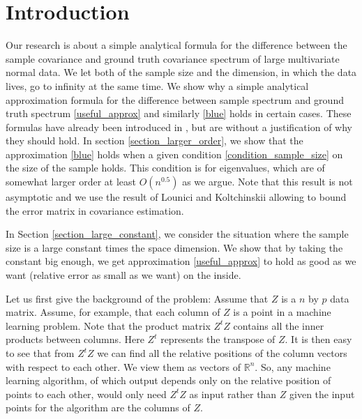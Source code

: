 \documentclass[12pt]{amsart}
\theoremstyle{definition}
\numberwithin{equation}{section}
\numberwithin{equation}{section}
\theoremstyle{remark}
\numberwithin{equation}{section}
\begin{document}
\section{Introduction}
\label{intro}
Our research is about a simple analytical formula for the difference between the sample covariance and ground truth covariance spectrum of large multivariate normal data. We let both of the sample size and the dimension, in which the
data lives, go to infinity at the same time. We show why a simple analytical approximation formula for the difference between sample spectrum and ground truth spectrum \ref{useful_approx} and similarly \ref{blue} holds in certain cases. These formulas have already been introduced in \cite{amsalu2018recovery}, but are without a justification of why they should hold. In section \ref{section_larger_order}, we show that the approximation \ref{blue} holds when a given condition \ref{condition_sample_size} on the size of the sample holds. This condition is for eigenvalues, which are of somewhat larger order at least
$O(n^{0.5})$ as we argue. Note that this result is not asymptotic and we use the result of Lounici and Koltchinskii \cite{koltchinskii2017normal} allowing to bound the error matrix in covariance estimation.

In Section \ref{section_large_constant}, we consider the situation where the sample size is a large constant times
the space dimension. We show that by taking the constant big enough, we get approximation \ref{useful_approx} to hold as good as we want (relative error as small as we want) on the inside.

Let us first give the background of the problem:
Assume  that $Z$ is a $n$ by $p$ data matrix. Assume, for example, that each column of $Z$ is a point in a machine learning problem. Note that the product matrix  $Z^t Z$ contains all the  inner products between columns. Here $Z^t$ represents the transpose of $Z$. It is then easy to see that from $Z^t Z$ we can find all the relative positions of the column vectors with respect to each other. We view them as vectors of $\mathbb{R}^n$. So, any machine learning algorithm, of which output depends only on the relative position of points to each other, would only need $Z^t Z$ as input rather than $Z$ given the input points for the algorithm are the columns of $Z$.
\end{document}

